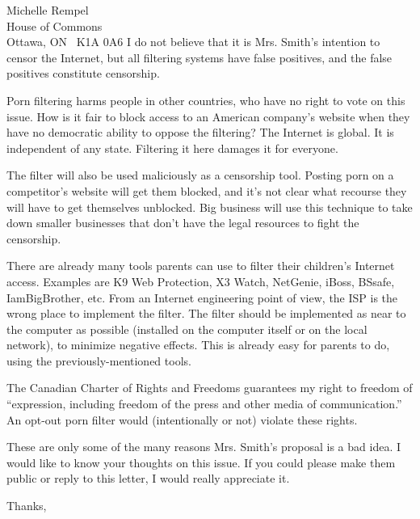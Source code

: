 \documentclass{letter}
\begin{document}
\begin{letter}{Michelle Rempel \\ House of Commons\\ Ottawa, ON \ K1A 0A6}
I do not believe that it is Mrs. Smith's intention to censor the Internet, but
all filtering systems have false positives, and the false positives constitute
censorship.

Porn filtering harms people in other countries, who have no right to vote on
this issue. How is it fair to block access to an American company's website when
they have no democratic ability to oppose the filtering? The Internet is global.
It is independent of any state. Filtering it here damages it for everyone.

The filter will also be used maliciously as a censorship tool. Posting porn on
a competitor's website will get them blocked, and it's not clear what recourse
they will have to get themselves unblocked. Big business will use this technique
to take down smaller businesses that don't have the legal resources to fight the
censorship.

There are already many tools parents can use to filter their children's Internet
access. Examples are K9 Web Protection, X3 Watch, NetGenie, iBoss, BSsafe,
IamBigBrother, etc. From an Internet engineering point of view, the ISP is the
wrong place to implement the filter. The filter should be implemented as near to
the computer as possible (installed on the computer itself or on the local
network), to minimize negative effects. This is already easy for parents to do,
using the previously-mentioned tools.

The Canadian Charter of Rights and Freedoms guarantees my right to freedom of
``expression, including freedom of the press and other media of communication.''
An opt-out porn filter would (intentionally or not) violate these rights.

These are only some of the many reasons Mrs. Smith's proposal is a bad idea.
I would like to know your thoughts on this issue. If you could please make them
public or reply to this letter, I would really appreciate it.


\closing{Thanks,}
\end{letter}
\end{document}
